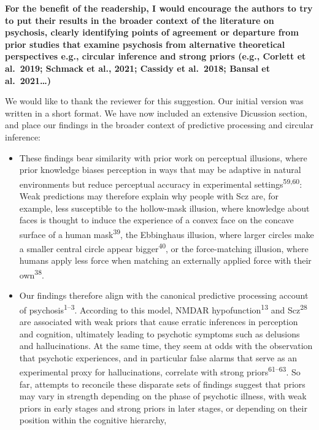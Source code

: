 \documentclass[
]{article}
\begin{document}
\textbf{For the benefit of the readership, I would encourage the authors
to try to put their results in the broader context of the literature on
psychosis, clearly identifying points of agreement or departure from
prior studies that examine psychosis from alternative theoretical
perspectives e.g., circular inference and strong priors (e.g., Corlett
et al.~2019; Schmack et al., 2021; Cassidy et al.~2018; Bansal et
al.~2021\ldots)}

We would like to thank the reviewer for this suggestion. Our initial
version was written in a short format. We have now included an extensive
Dicussion section, and place our findings in the broader context of
predictive processing and circular inference:

\begin{itemize}
\item
  These findings bear similarity with prior work on perceptual
  illusions, where prior knowledge biases perception in ways that may be
  adaptive in natural environments but reduce perceptual accuracy in
  experimental settings\textsuperscript{59,60}: Weak predictions may
  therefore explain why people with Scz are, for example, less
  susceptible to the hollow-mask illusion, where knowledge about faces
  is thought to induce the experience of a convex face on the concave
  surface of a human mask\textsuperscript{39}, the Ebbinghaus illusion,
  where larger circles make a smaller central circle appear
  bigger\textsuperscript{40}, or the force-matching illusion, where
  humans apply less force when matching an externally applied force with
  their own\textsuperscript{38}.
\item
  Our findings therefore align with the canonical predictive processing
  account of psychosis\textsuperscript{1--3}. According to this model,
  NMDAR hypofunction\textsuperscript{13} and Scz\textsuperscript{28} are
  associated with weak priors that cause erratic inferences in
  perception and cognition, ultimately leading to psychotic symptoms
  such as delusions and hallucinations. At the same time, they seem at
  odds with the observation that psychotic experiences, and in
  particular false alarms that serve as an experimental proxy for
  hallucinations, correlate with strong priors\textsuperscript{61--63}.
  So far, attempts to reconcile these disparate sets of findings suggest
  that priors may vary in strength depending on the phase of psychotic
  illness, with weak priors in early stages and strong priors in later
  stages, or depending on their position within the cognitive hierarchy,

\end{itemize}
\end{document}
